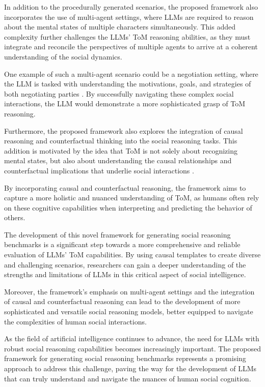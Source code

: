 \documentclass[11pt]{article}
\begin{document}
In addition to the procedurally generated scenarios, the proposed framework also incorporates the use of multi-agent settings, where LLMs are required to reason about the mental states of multiple characters simultaneously. This added complexity further challenges the LLMs' ToM reasoning abilities, as they must integrate and reconcile the perspectives of multiple agents to arrive at a coherent understanding of the social dynamics.

One example of such a multi-agent scenario could be a negotiation setting, where the LLM is tasked with understanding the motivations, goals, and strategies of both negotiating parties \cite{ref348}. By successfully navigating these complex social interactions, the LLM would demonstrate a more sophisticated grasp of ToM reasoning.

Furthermore, the proposed framework also explores the integration of causal reasoning and counterfactual thinking into the social reasoning tasks. This addition is motivated by the idea that ToM is not solely about recognizing mental states, but also about understanding the causal relationships and counterfactual implications that underlie social interactions \cite{ref347}.

By incorporating causal and counterfactual reasoning, the framework aims to capture a more holistic and nuanced understanding of ToM, as humans often rely on these cognitive capabilities when interpreting and predicting the behavior of others.

The development of this novel framework for generating social reasoning benchmarks is a significant step towards a more comprehensive and reliable evaluation of LLMs' ToM capabilities. By using causal templates to create diverse and challenging scenarios, researchers can gain a deeper understanding of the strengths and limitations of LLMs in this critical aspect of social intelligence.

Moreover, the framework's emphasis on multi-agent settings and the integration of causal and counterfactual reasoning can lead to the development of more sophisticated and versatile social reasoning models, better equipped to navigate the complexities of human social interactions.

As the field of artificial intelligence continues to advance, the need for LLMs with robust social reasoning capabilities becomes increasingly important. The proposed framework for generating social reasoning benchmarks represents a promising approach to address this challenge, paving the way for the development of LLMs that can truly understand and navigate the nuances of human social cognition.
\end{document}
